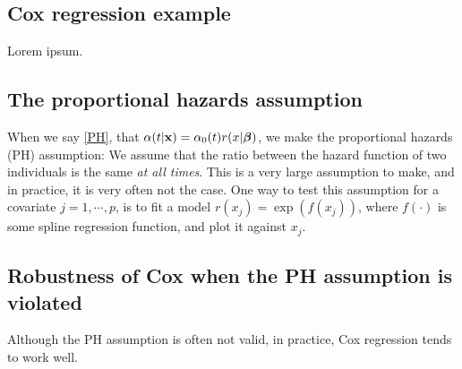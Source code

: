 \subsection{Cox regression example}
Lorem ipsum.

\subsection{The proportional hazards assumption}
When we say \eqref{PH}, that $\alpha(t|\mathbf{x})=\alpha_0(t)r(x|\boldsymbol{\beta})$, we make the proportional hazards (PH) assumption: We assume that the ratio between the hazard function of two individuals is the same \textit{at all times}. This is a very large assumption to make, and in practice, it is very often not the case. One way to test this assumption for a covariate $j=1,\cdots,p$, is to fit a model $r(x_j)=\exp(f(x_j))$, where $f(\cdot)$ is some spline regression function, and plot it against $x_j$.

\subsection{Robustness of Cox when the PH assumption is violated}
Although the PH assumption is often not valid, in practice, Cox regression tends to work well. 

